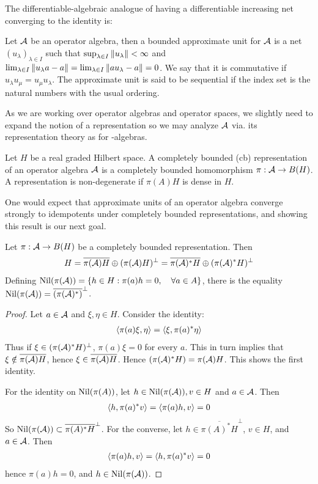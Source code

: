 The differentiable-algebraic analogue of having a differentiable increasing net converging to the identity is: 
\begin{definition}
	Let $\mathcal{A}$ be an operator algebra, then a bounded approximate unit for $\mathcal{A}$ is a net $(u_{\lambda})_{\lambda\in I}$ such that $\sup_{\lambda \in I}\left \Vert u_{\lambda} \right \Vert<\infty$ and $\lim_{\lambda\in I}\left \Vert u_\lambda a-a  \right \Vert=\lim_{\lambda \in I}\left \Vert au_{\lambda}-a \right \Vert=0$. We say that it is commutative if $u_{\lambda}u_{\mu}=u_{\mu}u_{\lambda}$. The approximate unit is said to be sequential if the index set is the natural numbers with the usual ordering. 
\end{definition}
As we are working over operator algebras and operator spaces, we slightly need to expand the notion of a representation so we may analyze $\mathcal{A}$ via. its representation theory as for \Cstar-algebras. 
\begin{definition}
	Let $H$ be a real graded Hilbert space. A completely bounded (cb) representation of an operator algebra $\mathcal{A}$ is a completely bounded homomorphism $\pi:\mathcal{A}\to B(H)$. A representation is non-degenerate if $\pi(A)H$ is dense in $H$. 
\end{definition}
One would expect that approximate units of an operator algebra converge strongly to idempotents under completely bounded representations, and showing this result is our next goal. 
\begin{lemma}
	Let $\pi:\mathcal{A}\to B(H)$ be a completely bounded representation. Then
	\begin{align*}
		H=\overline{\pi(\mathcal{A})H}\oplus (\pi(\mathcal{A})H)^\perp=\overline{\pi(\mathcal{A})^*H}\oplus (\pi(\mathcal{A})^* H)^\perp
	\end{align*}
	Defining $\operatorname{Nil}(\pi(\mathcal{A}))=\{h\in H: \pi(a)h=0, \quad \forall a\in A\}$, there is the equality $\operatorname{Nil}(\pi(\mathcal{A}))=\overline{(\pi(\mathcal{A})^*)}^{\perp}$. 
\end{lemma}
\begin{proof}
	Let $a\in \mathcal{A}$ and $\xi,\eta\in H$. Consider the identity: 
	\begin{align*}
		\left \langle \pi(a)\xi,\eta \right \rangle=\left \langle \xi,\pi(a)^*\eta \right \rangle
	\end{align*}
	Thus if $\xi \in (\pi(\mathcal{A})^*H)^\perp$, $\pi(a)\xi=0$ for every $a$. This in turn implies that $\xi\notin \overline{\pi(\mathcal{A})H}$, hence $\xi \in \overline{\pi(\mathcal{A})H}$. Hence $(\pi(\mathcal{A})^*H)=\pi(\mathcal{A})H$. This shows the first identity. 
	
	For the identity on $\operatorname{Nil}(\pi(A))$, let $h\in \operatorname{Nil}(\pi(\mathcal{A})),v\in H$ and $a\in \mathcal{A}$. Then 
	\begin{align*}
		\left \langle h,\pi(a)^*v \right \rangle=\left \langle \pi(a)h,v \right \rangle=0
	\end{align*}
	So $\operatorname{Nil}(\pi(\mathcal{A}))\subset \overline{\pi(A)^*H}^\perp$. For the converse, let $h\in  \overline{\pi(A)^*H}^\perp$, $v\in H$, and $a\in \mathcal{A}$. Then 
	\begin{align*}
		\left \langle \pi(a)h,v \right \rangle=\left \langle h,\pi(a)^*v \right \rangle=0
	\end{align*}
	hence $\pi(a)h=0$, and $h\in \operatorname{Nil}(\pi(\mathcal{A}))$.  
\end{proof}
